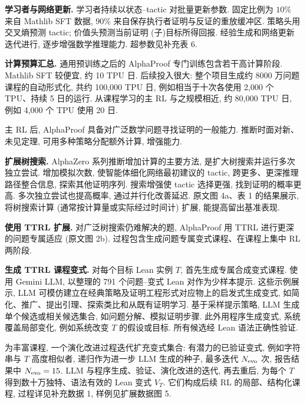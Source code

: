 \noindent\textbf{学习者与网络更新.} 学习者持续以状态--tactic 对批量更新参数. 固定比例为 $10\%$ 来自 Mathlib SFT 数据, $90\%$ 来自保存执行者证明与反证的重放缓冲区. 策略头用交叉熵预测 tactic; 价值头预测当前证明 (子)目标所得回报. 经验生成和网络更新迭代进行, 逐步增强数学推理能力. 超参数见补充表 6.

\noindent\textbf{计算预算汇总.} 通用预训练之后的 AlphaProof 专门训练包含若干高计算阶段. Mathlib SFT 较便宜, 约 10 TPU 日. 后续投入很大: 整个项目生成约 8000 万问题课程的自动形式化, 共约 100,000 TPU 日, 例如相当于十次各使用 2,000 个 TPU、持续 5 日的运行. 从课程学习的主 RL 与之规模相近, 约 80,000 TPU 日, 例如 4,000 个 TPU 使用 20 日.

\label{alphaproof-methods-inference}
主 RL 后, AlphaProof 具备对广泛数学问题寻找证明的一般能力. 推断时面对新、未见定理, 可用多种策略分配额外计算, 增强能力.

\noindent\textbf{扩展树搜索.} AlphaZero 系列\cite{alphaproof-ref2,alphaproof-ref72}推断增加计算的主要方法, 是扩大树搜索并运行多次独立尝试. 增加模拟次数, 使智能体细化网络最初建议的 tactic, 跨更多、更深推理路径整合信息, 探索其他证明序列. 搜索增强使 tactic 选择更强, 找到证明的概率更高. 多次独立尝试也提高概率, 通过并行化改善延迟. 原文图 4a、表 1 的结果展示, 将树搜索计算 (通常按计算量或实际经过时间计) 扩展, 能提高留出基准表现.

\noindent\textbf{使用 TTRL 扩展.} 对广泛树搜索仍难解决的题, AlphaProof 用 TTRL 进行更深的问题专属适应 (原文图 2b). 过程包含生成问题专属变式课程、在课程上集中 RL 两阶段.

\noindent\textbf{生成 TTRL 课程变式.} 对每个目标 Lean 实例 $T$, 首先生成专属合成变式课程. 使用 Gemini LLM\cite{alphaproof-ref22}, 以整理的 791 个问题--变式 Lean 对作为少样本提示. 这些示例展示, LLM 可模仿建立在经典策略\cite{alphaproof-ref75}及证明工程形式对应物上的启发式生成变式, 如简化\cite{alphaproof-ref76}、推广\cite{alphaproof-ref77}、提出引理\cite{alphaproof-ref78}、探索类比\cite{alphaproof-ref79}和从既有证明学习\cite{alphaproof-ref80}. 基于采样提示策略, LLM 生成单个候选或相关候选集合, 如问题分解、模拟证明步骤. 此外用程序生成变式, 系统覆盖局部变化, 例如系统改变 $T$ 的假设或目标. 所有候选经 Lean 语法正确性验证.

为丰富课程, 一个演化改进过程迭代扩充变式集合: 有潜力的已验证变式, 例如字符串与 $T$ 高度相似者, 递归作为进一步 LLM 生成的种子, 最多迭代 $N_{\rm evo}$ 次, 报告结果中 $N_{\rm evo}=15$. LLM 与程序生成、验证、演化改进的迭代, 再去重后, 为每个 $T$ 得到数十万独特、语法有效的 Lean 变式 $V_T$. 它们构成后续 RL 的局部、结构化课程, 过程详见补充数据 1, 样例见扩展数据图 5.

